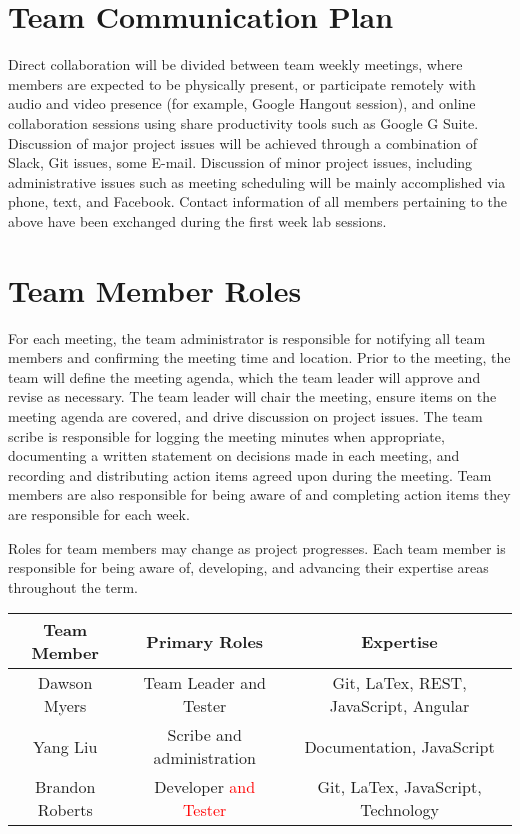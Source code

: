 \documentclass{article}
\begin{document}
\section{Team Communication Plan}
Direct collaboration will be divided between team weekly meetings, where members are expected to be physically present, or participate remotely with audio and video presence (for example, Google Hangout session), and online collaboration sessions using share productivity tools such as Google G Suite. Discussion of major project issues will be achieved through a combination of Slack, Git issues, some E-mail. Discussion of minor project issues, including administrative issues such as meeting scheduling will be mainly accomplished via phone, text, and Facebook. Contact information of all members pertaining to the above have been exchanged during the first week lab sessions. 


\section{Team Member Roles}
For each meeting, the team administrator is responsible for notifying all team members and confirming the meeting time and location. Prior to the meeting, the team will define the meeting agenda, which the team leader will approve and revise as necessary. The team leader will chair the meeting, ensure items on the meeting agenda are covered, and drive discussion on project issues. The team scribe is responsible for logging the meeting minutes when appropriate, documenting a written statement on decisions made in each meeting, and recording and distributing action items agreed upon during the meeting. Team members are also responsible for being aware of and completing action items they are responsible for each week.

Roles for team members may change as project progresses. Each team member is responsible for being aware of, developing, and advancing their expertise areas throughout the term.

\begin{center}
    \begin{tabular}{c | c | c}
         Team Member & Primary Roles & Expertise \\ 
         \hline
         Dawson Myers & Team Leader and Tester & Git, LaTex, REST, JavaScript, Angular \\  
         Yang Liu & Scribe and administration & Documentation, JavaScript \\
         Brandon Roberts & Developer \textcolor{red}{and Tester} & Git, LaTex, JavaScript, Technology \\
    \end{tabular}
\end{center}
\end{document}
